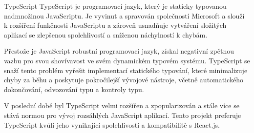 \begin{subsection}{TypeScript}
    \label{subsec:implementace-technologie-typescript}
    TypeScript je programovací jazyk, který je staticky typovanou nadmnožinou JavaScriptu.
    Je vyvinut a spravován společností Microsoft a slouží k rozšíření funkčnosti JavaScriptu a zároveň usnadňuje vytváření složitých aplikací se zlepšenou spolehlivostí a sníženou náchylností k chybám\cite{g_www_geeksforgeeks_org_difference_between_typescript_and_javascript}.

    Přestože je JavaScript robustní programovací jazyk, získal negativní zpětnou vazbu pro svou shovívavost ve svém dynamickém typovém systému.
    TypeScript se snaží tento problém vyřešit implementací statického typování, které minimalizuje chyby za běhu a poskytuje pokročilejší vývojové nástroje, včetně automatického dokončování, odvozování typu a kontroly typu\cite{g_www_geeksforgeeks_org_difference_between_typescript_and_javascript}.

    V poslední době byl TypeScript velmi rozšířen a zpopularizován a stále více se stává normou pro vývoj rozsáhlých JavaScript aplikací\cite{ct_the_relevance_of_typescript_in_2022_}.
    Tento projekt preferuje TypeScript kvůli jeho vynikající spolehlivosti a kompatibilitě s React.js.
\end{subsection}

